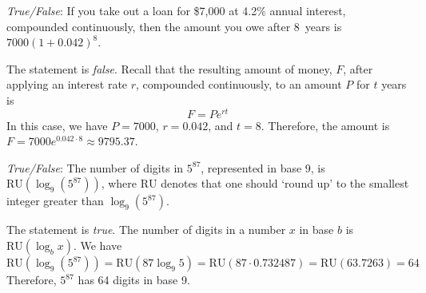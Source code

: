 \documentclass[11pt,letterpaper]{article}
\begin{document}
\quizsol \textit{True/False}: If you take out a loan for \$7,000 at 4.2\% annual interest, compounded continuously, then the amount you owe after 8~years is $7000(1 + 0.042)^8$. \pspace

\sol The statement is \textit{false}. Recall that the resulting amount of money, $F$, after applying an interest rate $r$, compounded continuously, to an amount $P$ for $t$ years is
	\[
	F= P e^{rt}
	\]
In this case, we have $P= 7000$, $r= 0.042$, and $t= 8$. Therefore, the amount is $F= 7000 e^{0.042 \cdot 8} \approx 9795.37$. 



\newpage



\quizsol \textit{True/False}: The number of digits in $5^{87}$, represented in base 9, is $\text{RU}(\log_9(5^{87}))$, where $\text{RU}$ denotes that one should `round up' to the smallest integer greater than $\log_9(5^{87})$. \pspace

\sol The statement is \textit{true}. The number of digits in a number $x$ in base $b$ is $\text{RU}(\log_b x)$. We have
	\[
	\text{RU}(\log_9(5^{87}))= \text{RU}(87 \log_9 5)= \text{RU}(87 \cdot 0.732487)= \text{RU}(63.7263)= 64
	\]
Therefore, $5^{87}$ has 64 digits in base 9. 
\end{document}
